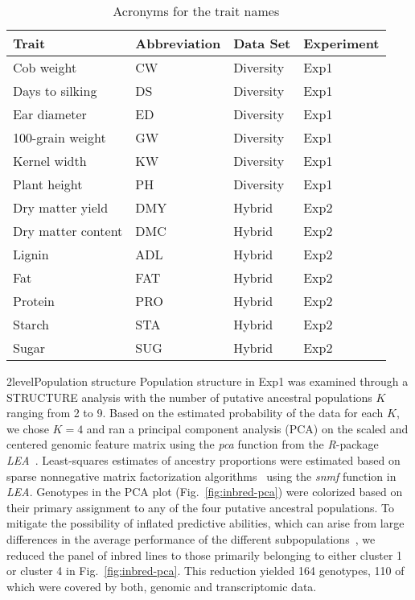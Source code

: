 \documentclass[12pt,titlepage]{article}
\begin{document}
\begin{table}[]
\centering
\caption{Acronyms for the trait names}
\label{table:TraitKey}
\begin{tabular}{@{}llll@{}}
\toprule
Trait              & Abbreviation & Data Set  & Experiment \\ \midrule
Cob weight         & CW           & Diversity & Exp1       \\
Days to silking    & DS           & Diversity & Exp1       \\
Ear diameter       & ED           & Diversity & Exp1       \\
100-grain weight   & GW           & Diversity & Exp1       \\
Kernel width       & KW           & Diversity & Exp1       \\
Plant height       & PH           & Diversity & Exp1       \\
Dry matter yield   & DMY          & Hybrid    & Exp2       \\
Dry matter content & DMC          & Hybrid    & Exp2       \\
Lignin             & ADL          & Hybrid    & Exp2       \\
Fat                & FAT          & Hybrid    & Exp2       \\
Protein            & PRO          & Hybrid    & Exp2       \\
Starch             & STA          & Hybrid    & Exp2       \\
Sugar              & SUG          & Hybrid    & Exp2       \\ \bottomrule
\end{tabular}
\end{table}


\Genetics2level{Population structure}
Population structure in Exp1 was examined through a STRUCTURE
\cite{Pritchard2000} analysis with the number of putative ancestral
populations $K$ ranging from 2 to 9.
Based on the estimated probability of the data for each $K$, we chose $K=4$
and ran a principal component analysis (PCA) on the scaled and centered
genomic feature matrix using the \emph{pca} function from the \emph{R}-package
\emph{LEA}~\cite{Frichot2015}.
Least-squares estimates of ancestry proportions were estimated based on sparse 
nonnegative matrix factorization algorithms~\cite{Frichot2014} using the 
\emph{snmf} function in \emph{LEA}.
Genotypes in the PCA plot (Fig.~\ref{fig:inbred-pca}) were colorized based on their
primary assignment to any of the four putative ancestral populations.
To mitigate the possibility of inflated predictive abilities, which can arise
from large differences in the average performance of the different
subpopulations~\cite{Windhausen2012}, we reduced the panel of inbred lines to
those primarily belonging to either cluster 1 or cluster 4 in 
Fig.~\ref{fig:inbred-pca}.
This reduction yielded 164 genotypes, 110 of which were covered by both, genomic
and transcriptomic data.
\end{document}
